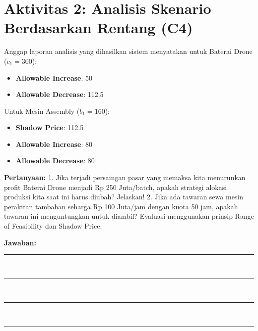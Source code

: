 \documentclass[11pt, a4paper]{article}
\begin{document}
\section*{Aktivitas 2: Analisis Skenario Berdasarkan Rentang (C4)}
Anggap laporan analisis yang dihasilkan sistem menyatakan untuk Baterai Drone ($c_1 = 300$):
\begin{itemize}
    \item \textbf{Allowable Increase}: 50
    \item \textbf{Allowable Decrease}: 112.5
\end{itemize}
Untuk Mesin Assembly ($b_1 = 160$):
\begin{itemize}
    \item \textbf{Shadow Price}: 112.5
    \item \textbf{Allowable Increase}: 80
    \item \textbf{Allowable Decrease}: 80
\end{itemize}

\textbf{Pertanyaan:}
1. Jika terjadi persaingan pasar yang memaksa kita menurunkan profit Baterai Drone menjadi Rp 250 Juta/batch, apakah strategi alokasi produksi kita saat ini harus diubah? Jelaskan!
2. Jika ada tawaran sewa mesin perakitan tambahan seharga Rp 100 Juta/jam dengan kuota 50 jam, apakah tawaran ini menguntungkan untuk diambil? Evaluasi menggunakan prinsip Range of Feasibility dan Shadow Price.

\vspace{1cm}
\textbf{Jawaban:} \\
\rule{\textwidth}{0.4pt} \\
\rule{\textwidth}{0.4pt} \\
\rule{\textwidth}{0.4pt} \\
\rule{\textwidth}{0.4pt}
\end{document}
